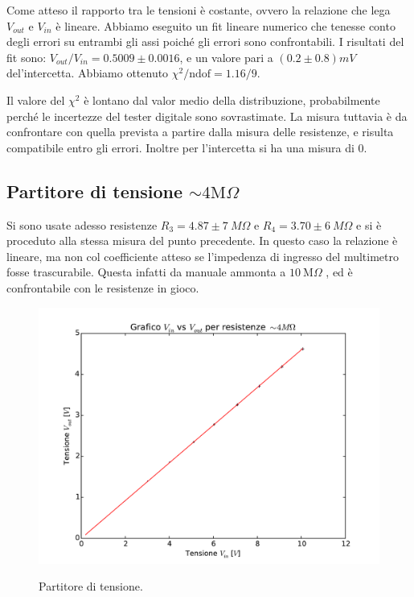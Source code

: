 \documentclass[10pt,a4paper]{article}
\begin{document}
Come atteso il rapporto tra le tensioni è costante, ovvero la relazione che lega $V_{out}$ e $V_{in}$ è lineare.
Abbiamo eseguito un fit lineare numerico che tenesse conto degli errori su entrambi gli assi poiché gli errori sono confrontabili. I risultati del fit sono: $V_{out}/V_{in}=0.5009 \pm 0.0016$, e un valore pari a $(0.2\pm 0.8) mV$ del'intercetta. Abbiamo ottenuto  $\chi^2/\text{ndof}= 1.16/9$.

Il valore del $\chi^2$ è lontano dal valor medio della distribuzione, probabilmente perché le incertezze del tester digitale sono sovrastimate. La misura tuttavia è da confrontare con quella prevista a partire dalla misura delle resistenze, e risulta compatibile entro gli errori. Inoltre per l'intercetta si ha una misura di $0$.

\subsection{Partitore di tensione $\sim4\text{M}\Omega$}
Si sono usate adesso resistenze $R_3=4.87 \pm 7 ~M\Omega$ e $R_4=3.70 \pm 6 ~M\Omega$ e si è proceduto alla stessa misura del punto precedente. In questo caso la relazione è lineare, ma non col coefficiente atteso se l'impedenza di ingresso del multimetro fosse trascurabile. Questa infatti da manuale ammonta a $10 ~ \text{M}\Omega$ , ed è confrontabile con le resistenze in gioco.

\begin{figure}[h]
\centering
\begin{minipage}[b]{.6\textwidth}
	\centering
	\includegraphics[scale=.5\textwidthwidth]{../grafici/fit_4MOhm.pdf}
	\caption{Partitore di tensione.}
	\label{f:par2}
\end{minipage}\hfill
\begin{minipage}[b]{.35\textwidth}
	\centering
	
	\label{...}
\end{minipage}\hspace*{\fill}
\end{figure}
\end{document}
